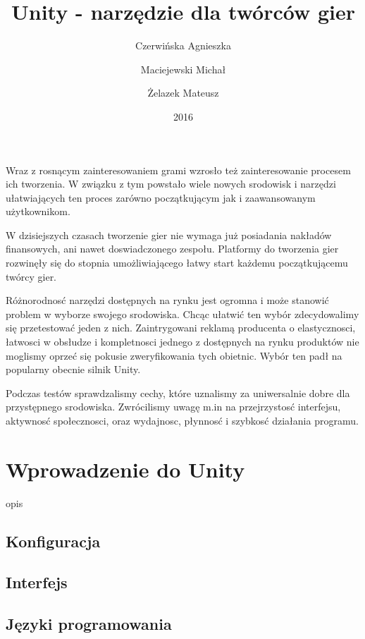 \documentclass[brudnopis]{xmgr}
\author   {Czerwińska Agnieszka}
\author   {Maciejewski Michał}
\author   {Żelazek Mateusz}
\title    {Unity - narzędzie dla twórców gier}
\date     {2016}
\begin{document}
\begin{abstract}
\end{abstract}


\maketitle

\introduction

Wraz z rosnącym zainteresowaniem grami wzrosło też zainteresowanie procesem ich tworzenia. W związku z tym powstało wiele nowych srodowisk i narzędzi ułatwiających ten proces zarówno początkującym jak i zaawansowanym użytkownikom. 

W dzisiejszych czasach tworzenie gier nie wymaga już posiadania nakładów finansowych, ani nawet doswiadczonego zespołu. Platformy do tworzenia gier rozwinęły się do stopnia umożliwiającego łatwy start każdemu początkującemu twórcy gier.  

Różnorodnosć narzędzi dostępnych na rynku jest ogromna i może stanowić problem w wyborze swojego srodowiska. Chcąc ułatwić ten wybór zdecydowalimy się przetestować jeden z nich. Zaintrygowani reklamą producenta o elastycznosci, łatwosci w obsłudze i kompletnosci jednego z dostępnych na rynku  produktów nie moglismy oprzeć się pokusie zweryfikowania tych obietnic. Wybór ten padł na popularny obecnie silnik Unity.

Podczas testów sprawdzalismy cechy, które uznalismy za uniwersalnie dobre dla przystępnego srodowiska. Zwrócilismy uwagę m.in na przejrzystosć interfejsu, aktywnosć społecznosci, oraz wydajnosc, płynnosć i szybkosć działania programu.

\chapter{Wprowadzenie do Unity}

opis

\section{Konfiguracja}
\section{Interfejs}
\section{Języki programowania}
\end{document}
